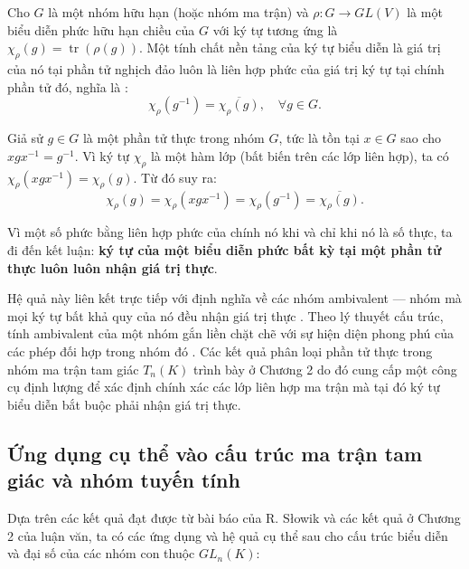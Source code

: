 Cho $G$ là một nhóm hữu hạn (hoặc nhóm ma trận) và $\rho: G \to GL(V)$ là một biểu diễn phức hữu hạn chiều của $G$ với ký tự tương ứng là $\chi_\rho(g) = \operatorname{tr}(\rho(g))$. Một tính chất nền tảng của ký tự biểu diễn là giá trị của nó tại phần tử nghịch đảo luôn là liên hợp phức của giá trị ký tự tại chính phần tử đó, nghĩa là \cite{JamesLiebeck2001}:
\[ \chi_\rho(g^{-1}) = \overline{\chi_\rho(g)}, \quad \forall g \in G. \]

Giả sử $g \in G$ là một phần tử thực trong nhóm $G$, tức là tồn tại $x \in G$ sao cho $xgx^{-1} = g^{-1}$. Vì ký tự $\chi_\rho$ là một hàm lớp (bất biến trên các lớp liên hợp), ta có $\chi_\rho(xgx^{-1}) = \chi_\rho(g)$. Từ đó suy ra:
\[ \chi_\rho(g) = \chi_\rho(xgx^{-1}) = \chi_\rho(g^{-1}) = \overline{\chi_\rho(g)}. \]

Vì một số phức bằng liên hợp phức của chính nó khi và chỉ khi nó là số thực, ta đi đến kết luận: \textbf{ký tự của một biểu diễn phức bất kỳ tại một phần tử thực luôn luôn nhận giá trị thực}.

Hệ quả này liên kết trực tiếp với định nghĩa về các nhóm ambivalent — nhóm mà mọi ký tự bất khả quy của nó đều nhận giá trị thực \cite{Armeanu1996,ArmeanuVarga2001}. Theo lý thuyết cấu trúc, tính ambivalent của một nhóm gắn liền chặt chẽ với sự hiện diện phong phú của các phép đối hợp trong nhóm đó \cite{ArmeanuVarga2001}. Các kết quả phân loại phần tử thực trong nhóm ma trận tam giác $T_n(K)$ trình bày ở Chương 2 do đó cung cấp một công cụ định lượng để xác định chính xác các lớp liên hợp ma trận mà tại đó ký tự biểu diễn bắt buộc phải nhận giá trị thực.

\subsection{Ứng dụng cụ thể vào cấu trúc ma trận tam giác và nhóm tuyến tính}

Dựa trên các kết quả đạt được từ bài báo của R. Słowik \cite{Slowik2013} và các kết quả ở Chương 2 của luận văn, ta có các ứng dụng và hệ quả cụ thể sau cho cấu trúc biểu diễn và đại số của các nhóm con thuộc $GL_n(K)$:

